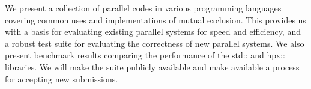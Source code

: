 We present a collection of parallel codes in various programming languages covering common uses and implementations of mutual exclusion. This provides us with a basis for evaluating existing parallel systems for speed and efficiency, and a robust test suite for evaluating the correctness of new parallel systems. We also present benchmark results comparing the performance of the std:: and hpx:: libraries. We will make the suite publicly available and make available a process for accepting new submissions.
